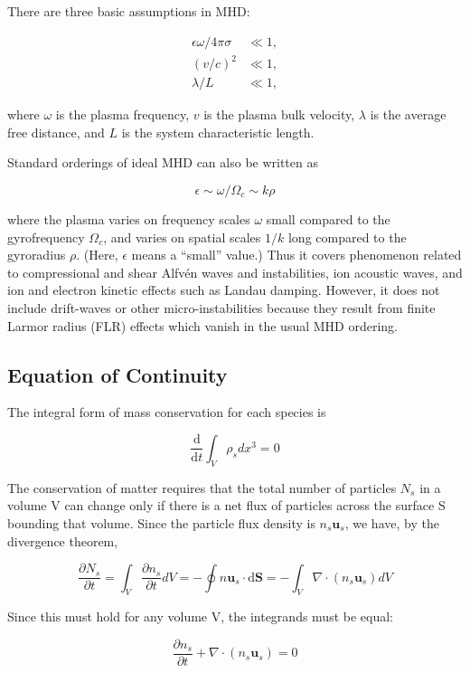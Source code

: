\documentclass[
  notoc %
]{tufte-book}
\begin{document}
There are three basic assumptions in MHD:

\[
\begin{aligned}
\epsilon\omega/4\pi\sigma& \ll 1, \\
(v/c)^2&\ll 1,\\
\lambda/ L& \ll 1,
\end{aligned}
\]

where \(\omega\) is the plasma frequency, \(v\) is the plasma bulk
velocity, \(\lambda\) is the average free distance, and \(L\) is the
system characteristic length.

Standard orderings of ideal MHD can also be written as

\[
\epsilon \sim \omega/\Omega_c \sim k\rho
\]

where the plasma varies on frequency scales \(\omega\) small compared to
the gyrofrequency \(\Omega_c\), and varies on spatial scales \(1/k\)
long compared to the gyroradius \(\rho\). (Here, \(\epsilon\) means a
``small'' value.) Thus it covers phenomenon related to compressional and
shear Alfvén waves and instabilities, ion acoustic waves, and ion and
electron kinetic effects such as Landau damping. However, it does not
include drift-waves or other micro-instabilities because they result
from finite Larmor radius (FLR) effects which vanish in the usual MHD
ordering.

\hypertarget{equation-of-continuity}{%
\subsection{Equation of Continuity}\label{equation-of-continuity}}

The integral form of mass conservation for each species is

\[
\frac{\mathrm{d}}{\mathrm{d}t}\int_V \rho_s dx^3=0
\]

The conservation of matter requires that the total number of particles
\(N_s\) in a volume V can change only if there is a net flux of
particles across the surface S bounding that volume. Since the particle
flux density is \(n_s\mathbf{u}_s\), we have, by the divergence theorem,

\[
\frac{\partial N_s}{\partial t} = \int_V\frac{\partial n_s}{\partial t}dV = -\oint n\mathbf{u}_s\cdot \mathrm{d}\mathbf{S} = - \int_V \nabla\cdot(n_s\mathbf{u}_s)dV
\]

Since this must hold for any volume V, the integrands must be equal:

\[
\frac{\partial n_s}{\partial t} + \nabla\cdot(n_s\mathbf{u}_s) = 0
\]
\end{document}
